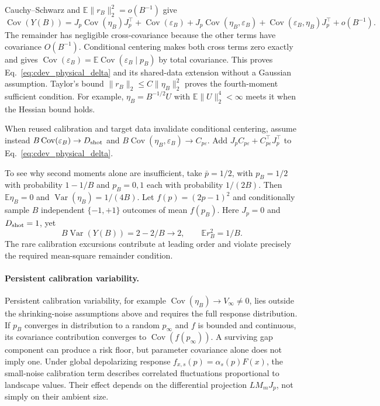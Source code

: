 \documentclass[a4paper,onecolumn,unpublished,nopdfoutputerror]{quantumarticle}
\theoremstyle{plain}
\theoremstyle{definition}
\newcommand{\E}{\mathbb{E}}
\newcommand{\Var}{\operatorname{Var}}
\newcommand{\Cov}{\operatorname{Cov}}
\newcommand{\1}{\mathbf{1}}
\begin{document}
Cauchy--Schwarz and $\E\|r_B\|_2^2=o(B^{-1})$ give
\[
\Cov(Y(B))=J_p\Cov(\eta_B)J_p^\top+\Cov(\varepsilon_B)
+J_p\Cov(\eta_B,\varepsilon_B)+\Cov(\varepsilon_B,\eta_B)J_p^\top
+o(B^{-1}).
\]
The remainder has negligible cross-covariance because the other terms have covariance $O(B^{-1})$. Conditional centering makes both cross terms zero exactly and gives $\Cov(\varepsilon_B)=\E\Cov(\varepsilon_B\mid p_B)$ by total covariance. This proves Eq.~\eqref{eq:cdev_physical_delta} and its shared-data extension without a Gaussian assumption. Taylor's bound $\|r_B\|_2\le C\|\eta_B\|_2^2$ proves the fourth-moment sufficient condition. For example, $\eta_B=B^{-1/2}U$ with $\E\|U\|_2^4<\infty$ meets it when the Hessian bound holds.

When reused calibration and target data invalidate conditional centering, assume instead $B\Cov(\varepsilon_B)\to D_{\rm shot}$ and $B\Cov(\eta_B,\varepsilon_B)\to C_{p\varepsilon}$. Add $J_pC_{p\varepsilon}+C_{p\varepsilon}^\top J_p^\top$ to Eq.~\eqref{eq:cdev_physical_delta}.

To see why second moments alone are insufficient, take $\bar p=1/2$, with $p_B=1/2$ with probability $1-1/B$ and $p_B=0,1$ each with probability $1/(2B)$. Then $\E\eta_B=0$ and $\Var(\eta_B)=1/(4B)$. Let $f(p)=(2p-1)^2$ and conditionally sample $B$ independent $\{-1,+1\}$ outcomes of mean $f(p_B)$. Here $J_p=0$ and $D_{\rm shot}=1$, yet
\[
B\Var(Y(B))=2-2/B\longrightarrow2,
\qquad \E r_B^2=1/B.
\]
The rare calibration excursions contribute at leading order and violate precisely the required mean-square remainder condition.

\paragraph{Persistent calibration variability.}
Persistent calibration variability, for example $\Cov(\eta_B)\to V_\infty\ne0$, lies outside the shrinking-noise assumptions above and requires the full response distribution. If $p_B$ converges in distribution to a random $p_\infty$ and $f$ is bounded and continuous, its covariance contribution converges to $\Cov(f(p_\infty))$. A surviving gap component can produce a risk floor, but parameter covariance alone does not imply one. Under global depolarizing response $f_{x,s}(p)=\alpha_s(p)F(x)$, the small-noise calibration term describes correlated fluctuations proportional to landscape values. Their effect depends on the differential projection $LM_mJ_p$, not simply on their ambient size.
\end{document}
